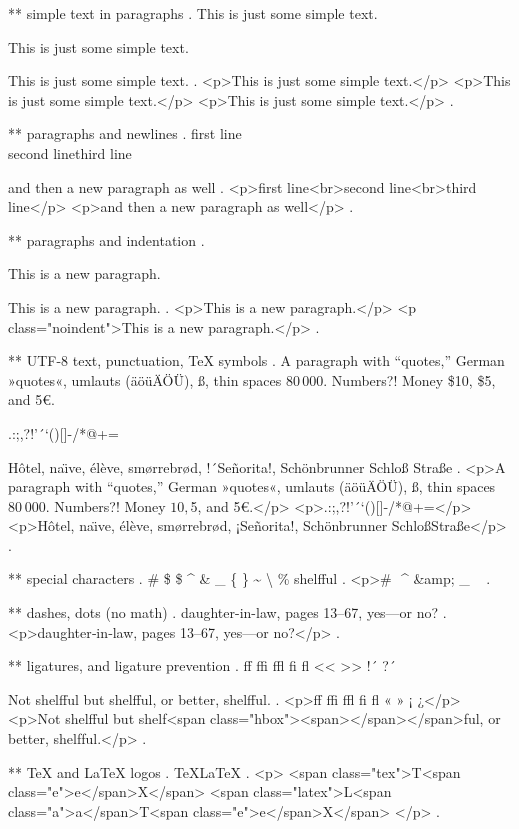 ** simple text in paragraphs
.
This is just some simple text.

This is just some simple text.

This is just some simple text.
.
<p>This is just some simple text.</p>
<p>This is just some simple text.</p>
<p>This is just some simple text.</p>
.


** paragraphs and newlines
.
first line\\second line\newline third line\par and then a new paragraph as well
.
<p>ﬁrst line<br>second line<br>third line</p>
<p>and then a new paragraph as well</p>
.


** paragraphs and indentation
.
\noindent

\noindent

This is a new paragraph.

\noindent
This is a new paragraph.
.
<p>This is a new paragraph.</p>
<p class="noindent">This is a new paragraph.</p>
.


** UTF-8 text, punctuation, TeX symbols
.
A para\-graph with “quotes,” German »quotes«, umlauts (äöüÄÖÜ), ß, thin spaces 80\,000. Numbers?! Money \$10, \$5, and 5€.

.:;,?!'´`()[]-/*@+=

H\^otel, na\"\i ve, \'el\`eve, sm\o rrebr\o d, !´Se\~norita!, Sch\"onbrunner Schlo\ss{} Stra\ss e
.
<p>A para­graph with “quotes,” German »quotes«, umlauts (äöüÄÖÜ), ß, thin spaces 80 000. Numbers?! Money $10, $5, and 5€.</p>
<p>.:;,?!’´‘()[]‐/*@+=</p>
<p>Hôtel, naı̈ve, élève, smørrebrød, ¡Señorita!, Schönbrunner Schloß​ Straße</p>
.


** special characters
.
\# \$ \$ \^{} \& \_ \{ \} \~{} \textbackslash{} \% shelf\-ful
.
<p># $ $ ^​ &amp; _ { } ~​ \​ %
.


** dashes, dots (no math)
.
daughter-in-law, pages 13--67, yes---or no?
.
<p>daughter‐in‐law, pages 13–67, yes—or no?</p>
.


** ligatures, and ligature prevention
.
ff ffi ffl fi fl << >> !´ ?´

Not shelfful but shelf\mbox{}ful, or better, shelf\/ful.
.
<p>ﬀ ﬃ ﬄ ﬁ ﬂ « » ¡ ¿</p>
<p>Not shelﬀul but shelf<span class="hbox"><span></span></span>ful, or better, shelf‌ful.</p>
.


** TeX and LaTeX logos
.
\TeX \LaTeX
.
<p>
<span class="tex">T<span class="e">e</span>X</span>
<span class="latex">L<span class="a">a</span>T<span class="e">e</span>X</span>
</p>
.



